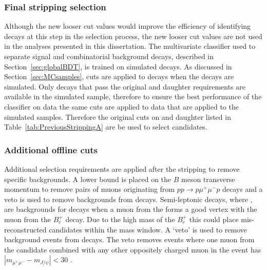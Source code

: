 \subsubsection*{Final stripping selection}
Although the new looser cut values would improve the efficiency of identifying \bmumu decays at this step in the selection process, the new looser cut values are not used in the analyses presented in this dissertation. The multivariate classifier used to separate signal and combinatorial background decays, described in Section~\ref{sec:globalBDT}, is trained on simulated \bbbarmumux decays. As discussed in Section~\ref{sec:MCsamples}, cuts are applied to \bbbarmumux decays when the decays are simulated. Only decays that pass the original \chiFD and daughter \chiIP requirements are available in the simulated sample, therefore to ensure the best performance of the classifier on data the same cuts are applied to data that are applied to the simulated samples. Therefore the original cuts on \chiFD and daughter \chiIP listed in Table~\ref{tab:PreviousStrippingA} are be used to select \bsmumu candidates.





\subsubsection{Additional offline cuts}
\label{finalloosesel}

Additional selection requirements are applied after the stripping to remove specific backgrounds. A lower bound is placed on the $B$ meson transverse momentum to remove pairs of muons originating from $pp \to p\mu^{+}\mu^{-} p$ decays and a \jpsi veto is used to remove backgrounds from \bcjpsimunu decays. Semi-leptonic \bcjpsimunu decays, where \jpsimumu, are backgrounds for \bmumu decays when a muon from the \jpsi forms a good vertex with the muon from the $B_{c}^{+}$ decay. Due to the high mass of the $B_{c}^{+}$ this could place mis-reconstructed candidates within the \bs mass window. A `\jpsi veto' is used to remove background events from \bcjpsimunu decays. The veto removes events where one muon from the \bmumu candidate combined with any other oppositely charged muon in the event has $|m_{\mu^{+}\mu^{-}} - m_{J/\psi}| < 30$  \mevcc. %

